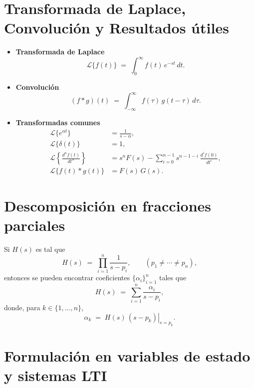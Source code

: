 \documentclass[
  11pt,
  letterpaper,
   addpoints,
  answers
  ]{exam}
\begin{document}
\section*{Transformada de Laplace, Convolución y Resultados útiles}

\begin{itemize}
  \item \textbf{Transformada de Laplace}
    \begin{equation}
      \mathcal{L}\{f(t)\} \;=\; \int_{0}^{\infty} f(t)\,e^{-st}\,dt.
    \end{equation}

  \item \textbf{Convolución}
    \begin{equation}
      (f\ast g)(t) \;=\; \int_{-\infty}^{\infty} f(\tau)\,g(t-\tau)\,d\tau.
    \end{equation}

  \item \textbf{Transformadas comunes}
    \begin{align}
      \mathcal{L}\{e^{\alpha t}\} &= \frac{1}{s-\alpha},\\[2pt]
      \mathcal{L}\{\delta(t)\} &= 1,\\[2pt]
      \mathcal{L}\left\{\frac{d^n f(t)}{dt^n}\right\}
      &= s^n F(s) - \sum_{i=0}^{n-1} s^{n-1-i}\, \frac{d^i f(0)}{dt^i},\\[2pt]
      \mathcal{L}\{f(t)\ast g(t)\} &= F(s)\,G(s).
    \end{align}
\end{itemize}

\section*{Descomposición en fracciones parciales}

Si $H(s)$ es tal que
\begin{equation}
  H(s) \;=\; \prod_{i=1}^{n} \frac{1}{s-p_i}, \qquad (p_1\neq\cdots\neq p_n),
\end{equation}
entonces se pueden encontrar coeficientes $\{\alpha_i\}_{i=1}^n$ tales que
\begin{equation}
  H(s) \;=\; \sum_{i=1}^{n} \frac{\alpha_i}{s-p_i},
\end{equation}
donde, para $k\in\{1,\dots,n\}$,
\begin{equation}
  \alpha_k \;=\; \left.H(s)\,(s-p_k)\right|_{s=p_k}.
\end{equation}

\section*{Formulación en variables de estado y sistemas LTI}
\end{document}
